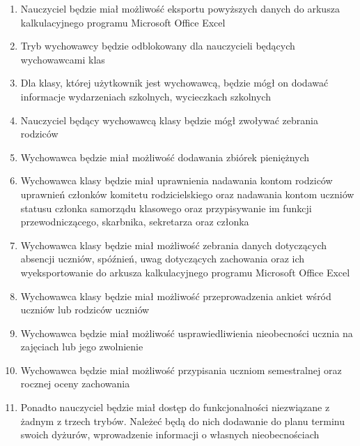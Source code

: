 \documentclass{article}
\begin{document}
\begin{enumerate}
  \item Nauczyciel będzie miał możliwość eksportu powyższych danych do arkusza kalkulacyjnego programu Microsoft Office Excel
  \item Tryb wychowawcy będzie odblokowany dla nauczycieli będących wychowawcami klas
  \item Dla klasy, której użytkownik jest wychowawcą, będzie mógł on dodawać informacje wydarzeniach szkolnych, wycieczkach szkolnych
  \item Nauczyciel będący wychowawcą klasy będzie mógł zwoływać zebrania rodziców
  \item Wychowawca będzie miał możliwość dodawania zbiórek pieniężnych
  \item Wychowawca klasy będzie miał uprawnienia nadawania kontom rodziców uprawnień członków komitetu rodzicielskiego oraz nadawania kontom uczniów statusu członka samorządu klasowego oraz przypisywanie im funkcji przewodniczącego, skarbnika, sekretarza oraz członka
  \item Wychowawca klasy będzie miał możliwość zebrania danych dotyczących absencji uczniów, spóźnień, uwag dotyczących zachowania oraz ich wyeksportowanie do arkusza kalkulacyjnego programu Microsoft Office Excel
  \item Wychowawca klasy będzie miał możliwość przeprowadzenia ankiet wśród uczniów lub rodziców uczniów
  \item Wychowawca będzie miał możliwość usprawiedliwienia nieobecności ucznia na zajęciach lub jego zwolnienie
  \item Wychowawca będzie miał możliwość przypisania uczniom semestralnej oraz rocznej oceny zachowania
  \item Ponadto nauczyciel będzie miał dostęp do funkcjonalności niezwiązane z żadnym z trzech trybów. Należeć będą do nich dodawanie do planu terminu swoich dyżurów, wprowadzenie informacji o własnych nieobecnościach
\end{enumerate}
\end{document}
